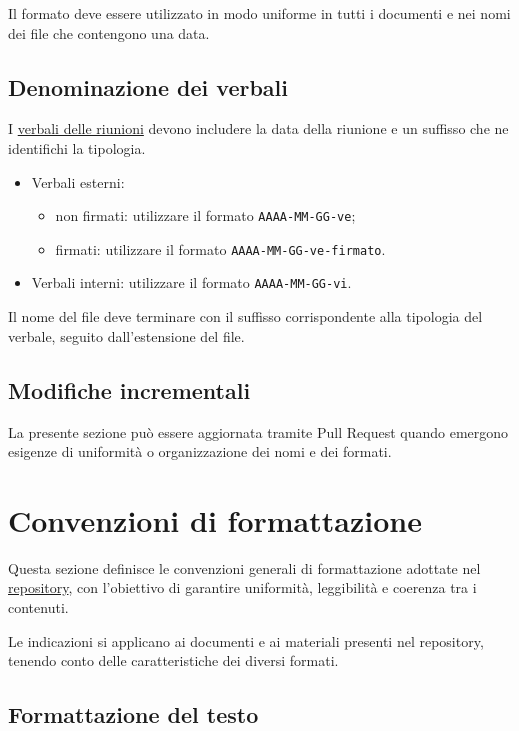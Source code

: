 \documentclass[11pt, a4paper]{article}
\begin{document}
\noindent Il formato deve essere utilizzato in modo uniforme in tutti i documenti e nei nomi dei file che contengono una data.

\subsection{Denominazione dei verbali}

I \href{https://github.com/On-By-One-Team/On-By-One.github.io/tree/main/docs/pdf/verbali}{verbali delle riunioni} devono includere la data della riunione e un suffisso che ne identifichi la tipologia.
\begin{itemize}
    \item Verbali esterni:
    \begin{itemize}
        \item non firmati: utilizzare il formato \texttt{AAAA-MM-GG-ve};
        \item firmati: utilizzare il formato \texttt{AAAA-MM-GG-ve-firmato}.
    \end{itemize}
    \item Verbali interni: utilizzare il formato \texttt{AAAA-MM-GG-vi}.
\end{itemize}

\noindent Il nome del file deve terminare con il suffisso corrispondente alla tipologia del verbale, seguito dall'estensione del file.

\subsection{Modifiche incrementali}

La presente sezione può essere aggiornata tramite Pull Request quando emergono esigenze di uniformità o organizzazione dei nomi e dei formati.

\section{Convenzioni di formattazione}

Questa sezione definisce le convenzioni generali di formattazione adottate nel \href{https://github.com/On-By-One-Team/On-By-One.github.io}{repository}, con l'obiettivo di garantire uniformità, leggibilità e coerenza tra i contenuti.

Le indicazioni si applicano ai documenti e ai materiali presenti nel repository, tenendo conto delle caratteristiche dei diversi formati.

\subsection{Formattazione del testo}
\label{subsec:formattazione-del-testo}
\end{document}
